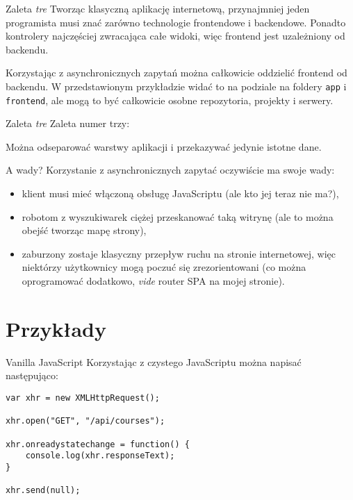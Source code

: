 \begin{frame}{Zaleta \emph{tre}}
	Tworząc klasyczną aplikację internetową, przynajmniej jeden programista musi znać zarówno technologie frontendowe i backendowe. Ponadto kontrolery najczęściej zwracająca całe widoki, więc frontend jest uzależniony od backendu.
	
	Korzystając z asynchronicznych zapytań można całkowicie oddzielić frontend od backendu. W przedstawionym przykładzie widać to na podziale na foldery \texttt{app} i \texttt{frontend}, ale mogą to być całkowicie osobne repozytoria, projekty i serwery.
\end{frame}

\begin{frame}{Zaleta \emph{tre}}
	Zaleta numer trzy:
	
	Można odseparować warstwy aplikacji i przekazywać jedynie istotne dane.
\end{frame}

\begin{frame}{A wady?}
	Korzystanie z asynchronicznych zapytać oczywiście ma swoje wady:
	\begin{itemize}
	\item klient musi mieć włączoną obsługę JavaScriptu (ale kto jej teraz nie ma?),
	\item robotom z wyszukiwarek ciężej przeskanować taką witrynę (ale to można obejść tworząc mapę strony),
	\item zaburzony zostaje klasyczny przepływ ruchu na stronie internetowej, więc niektórzy użytkownicy mogą poczuć się zrezorientowani (co można oprogramować dodatkowo, \emph{vide} router SPA na mojej stronie).
	\end{itemize}
\end{frame}

\section{Przykłady}

\begin{frame}[fragile]{Vanilla JavaScript}
	Korzystając z czystego JavaScriptu można napisać następująco:
	
	\begin{lstlisting}
var xhr = new XMLHttpRequest();

xhr.open("GET", "/api/courses");

xhr.onreadystatechange = function() {
    console.log(xhr.responseText);
}

xhr.send(null);
	\end{lstlisting}
\end{frame}

